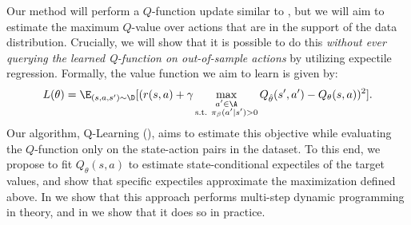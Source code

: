 Our method will perform a $Q$-function update similar to , but we will aim to estimate the maximum $Q$-value over actions that are in the support of the data distribution. Crucially, we will show that it is possible to do this \emph{without ever querying the learned Q-function on out-of-sample actions} by utilizing expectile regression. Formally, the value function we aim to learn is given by:
\begin{equation}
L(\theta) = \E_{(s, a, s')\sim\D}[(r(s,a) + \gamma  \max_{\substack{a'\in \A \\\text{s.t. }\pi_\beta(a'|s') > 0}}Q_{\hat{\theta}}(s',a') - Q_\theta(s,a))^2].
\label{eqn:bq_learning}
\end{equation}
Our algorithm, \ournamepref Q-Learning (\ourname), aims to estimate this objective while evaluating the $Q$-function only on the state-action pairs in the dataset. To this end, we propose to fit $Q_\theta(s,a)$ to estimate state-conditional expectiles of the target values, and show that
specific expectiles approximate the maximization defined above.
In  we show that this approach performs multi-step dynamic programming in theory, and in  we show that it does so in practice.

